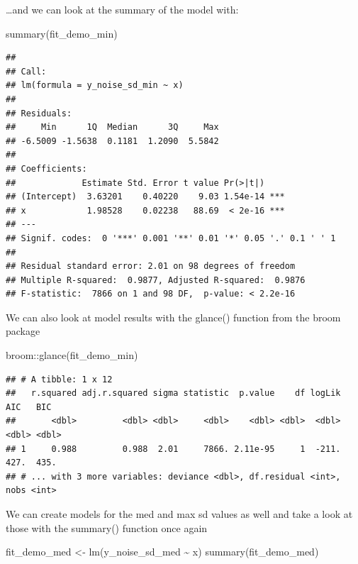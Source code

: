 \documentclass[
]{book}
\newenvironment{Shaded}{\begin{snugshade}}{\end{snugshade}}
\newcommand{\FunctionTok}[1]{\textcolor[rgb]{0.00,0.00,0.00}{#1}}
\newcommand{\NormalTok}[1]{#1}
\newcommand{\OtherTok}[1]{\textcolor[rgb]{0.56,0.35,0.01}{#1}}
\newcommand{\SpecialCharTok}[1]{\textcolor[rgb]{0.00,0.00,0.00}{#1}}
\begin{document}
\ldots and we can look at the summary of the model with:

\begin{Shaded}
\begin{Highlighting}[]
\FunctionTok{summary}\NormalTok{(fit\_demo\_min)}
\end{Highlighting}
\end{Shaded}

\begin{verbatim}
## 
## Call:
## lm(formula = y_noise_sd_min ~ x)
## 
## Residuals:
##     Min      1Q  Median      3Q     Max 
## -6.5009 -1.5638  0.1181  1.2090  5.5842 
## 
## Coefficients:
##             Estimate Std. Error t value Pr(>|t|)    
## (Intercept)  3.63201    0.40220    9.03 1.54e-14 ***
## x            1.98528    0.02238   88.69  < 2e-16 ***
## ---
## Signif. codes:  0 '***' 0.001 '**' 0.01 '*' 0.05 '.' 0.1 ' ' 1
## 
## Residual standard error: 2.01 on 98 degrees of freedom
## Multiple R-squared:  0.9877, Adjusted R-squared:  0.9876 
## F-statistic:  7866 on 1 and 98 DF,  p-value: < 2.2e-16
\end{verbatim}

We can also look at model results with the glance() function from the broom package

\begin{Shaded}
\begin{Highlighting}[]
\NormalTok{broom}\SpecialCharTok{::}\FunctionTok{glance}\NormalTok{(fit\_demo\_min)}
\end{Highlighting}
\end{Shaded}

\begin{verbatim}
## # A tibble: 1 x 12
##   r.squared adj.r.squared sigma statistic  p.value    df logLik   AIC   BIC
##       <dbl>         <dbl> <dbl>     <dbl>    <dbl> <dbl>  <dbl> <dbl> <dbl>
## 1     0.988         0.988  2.01     7866. 2.11e-95     1  -211.  427.  435.
## # ... with 3 more variables: deviance <dbl>, df.residual <int>, nobs <int>
\end{verbatim}

We can create models for the med and max sd values as well and take a look at those with the summary() function once again

\begin{Shaded}
\begin{Highlighting}[]
\NormalTok{fit\_demo\_med }\OtherTok{\textless{}{-}} \FunctionTok{lm}\NormalTok{(y\_noise\_sd\_med }\SpecialCharTok{\textasciitilde{}}\NormalTok{ x)}
\FunctionTok{summary}\NormalTok{(fit\_demo\_med)}
\end{Highlighting}
\end{Shaded}
\end{document}
